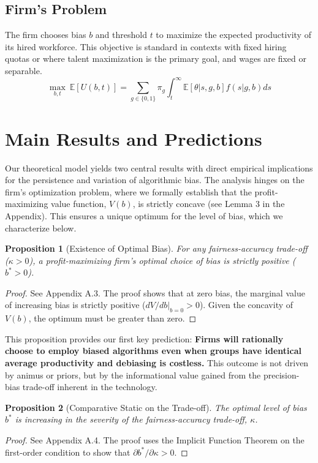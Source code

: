 \documentclass[12pt,a4paper]{article}
\newtheorem{proposition}{Proposition}
\theoremstyle{definition}
\theoremstyle{remark}
\begin{document}
\subsection{Firm's Problem}
The firm chooses bias $b$ and threshold $t$ to maximize the expected productivity of its hired workforce. This objective is standard in contexts with fixed hiring quotas or where talent maximization is the primary goal, and wages are fixed or separable.
\begin{equation}
\max_{b, t} \ \mathbb{E}[U(b,t)] = \sum_{g \in \{0,1\}} \pi_g \int_t^\infty \mathbb{E}[\theta | s, g, b] f(s|g, b) ds
\end{equation}

\section{Main Results and Predictions}

Our theoretical model yields two central results with direct empirical implications for the persistence and variation of algorithmic bias. The analysis hinges on the firm's optimization problem, where we formally establish that the profit-maximizing value function, $V(b)$, is strictly concave (see Lemma 3 in the Appendix). This ensures a unique optimum for the level of bias, which we characterize below.

\begin{proposition}[Existence of Optimal Bias]
\label{prop:existence}
For any fairness-accuracy trade-off ($\kappa > 0$), a profit-maximizing firm's optimal choice of bias is strictly positive ($b^* > 0$).
\end{proposition}
\begin{proof}
See Appendix A.3. The proof shows that at zero bias, the marginal value of increasing bias is strictly positive ($dV/db|_{b=0} > 0$). Given the concavity of $V(b)$, the optimum must be greater than zero.
\end{proof}

This proposition provides our first key prediction: \textbf{Firms will rationally choose to employ biased algorithms even when groups have identical average productivity and debiasing is costless.} This outcome is not driven by animus or priors, but by the informational value gained from the precision-bias trade-off inherent in the technology.

\begin{proposition}[Comparative Static on the Trade-off]
\label{prop:comparative_static}
The optimal level of bias $b^*$ is increasing in the severity of the fairness-accuracy trade-off, $\kappa$.
\end{proposition}
\begin{proof}
See Appendix A.4. The proof uses the Implicit Function Theorem on the first-order condition to show that $\partial b^*/\partial\kappa > 0$.
\end{proof}
\end{document}

